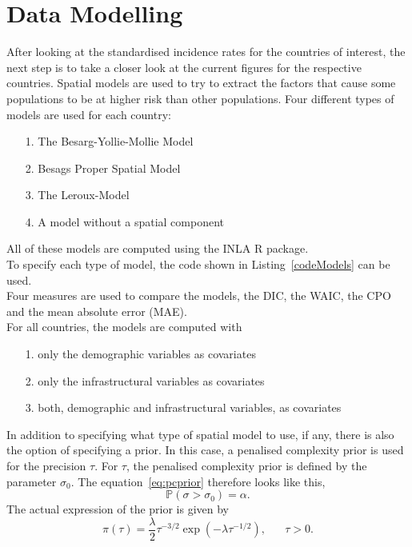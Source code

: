 \section{Data Modelling}
After looking at the standardised incidence rates for the countries of interest, the next step is to take a closer look at the current figures for the respective countries. Spatial models are used to try to extract the factors that cause some populations to be at higher risk than other populations. Four different types of models are used for each country:
\begin{itemize}
    \item[1.] The Besarg-Yollie-Mollie Model
    \item[2.] Besags Proper Spatial Model
    \item[3.] The Leroux-Model
    \item[4.] A model without a spatial component
\end{itemize}
All of these models are computed using the INLA \cite{rinla} R package. \\
To specify each type of model, the code shown in Listing~\ref{codeModels} can be used. \\
Four measures are used to compare the models, the DIC, the WAIC, the CPO and the mean absolute error (MAE).\\
For all countries, the models are computed with
\begin{itemize}
    \item[1.] only the demographic variables as covariates
    \item[2.] only the infrastructural variables as covariates
    \item[3.] both, demographic and infrastructural variables, as covariates
\end{itemize}
In addition to specifying what type of spatial model to use, if any, there is also the option of specifying a prior. In this case, a penalised complexity prior is used for the precision $\tau$. For $\tau$, the penalised complexity prior is defined by the parameter $\sigma_0$. The equation~\ref{eq:pcprior} therefore looks like this,
\begin{equation}\label{pcprec}
    \mathbb{P}\left(\sigma > \sigma_0\right)=\alpha.
\end{equation}
The actual expression of the prior is given by
\begin{equation}
    \pi\left(\tau\right)=\frac{\lambda}{2}\tau^{-3/2}\exp\left(-\lambda\tau^{-1/2}\right),\hspace{20pt}\tau>0.
\end{equation}
